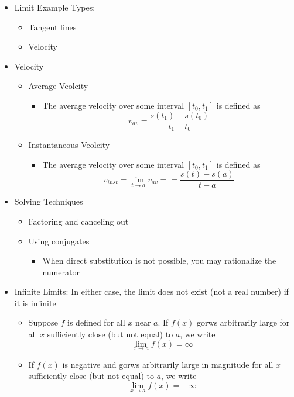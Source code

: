 \documentclass{article}
\begin{document}
\begin{itemize}
    \item Limit Example Types:
        \begin{itemize}
            \item Tangent lines
            \item Velocity
        \end{itemize}
    \item Velocity
        \begin{itemize}
            \item Average Veolcity
            \begin{itemize}
                \item The average velocity over some interval $[t_0, t_1]$ is defined as
                $$v_{av} = \frac{s(t_1) - s(t_0)}{t_1 - t_0}$$
            \end{itemize}
            \item Instantaneous Veolcity
            \begin{itemize}
                \item The average velocity over some interval $[t_0, t_1]$ is defined as
                $$v_{inst} = \lim_{t \to a}{v_{av}} = = \frac{s(t) - s(a)}{t - a}$$
            \end{itemize}
        \end{itemize}
    \item Solving Techniques
        \begin{itemize}
    	    \item Factoring and canceling out
    	    \item Using conjugates
            \begin{itemize}
    	    	\item When direct substitution is not possible, you may rationalize the numerator
            \end{itemize}
        \end{itemize}
	\item Infinite Limits: In either case, the limit does not exist (not a real number) if it is infinite
	\begin{itemize}
		\item Suppose $f$ is defined for all $x$ near $a$. If $f(x)$ gorws arbitrarily large for all $x$ sufficiently close (but not equal) to $a$, we write
		$$\lim_{x \to a}{f(x)} = \infty$$
		\item If $f(x)$ is negative and gorws arbitrarily large in magnitude for all $x$ sufficiently close (but not equal) to $a$, we write
		$$\lim_{x \to a}{f(x)} = - \infty$$

\end{itemize}
\end{itemize}
\end{document}
